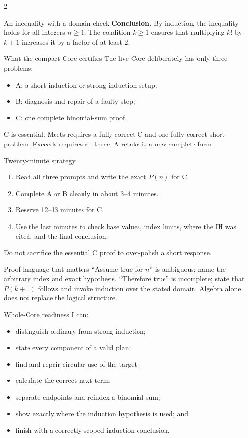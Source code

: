 \documentclass[10pt]{article}
\begin{document}
\begin{multicols}{2}
\begin{workedbox}{An inequality with a domain check}
\textbf{Conclusion.} By induction, the inequality holds for all integers
$n\ge1$. The condition $k\ge1$ ensures that multiplying $k!$ by $k+1$
increases it by a factor of at least $2$.
\end{workedbox}

\columnbreak

\begin{definitionbox}{What the compact Core certifies}
The live Core deliberately has only three problems:
\begin{itemize}
  \item A: a short induction or strong-induction setup;
  \item B: diagnosis and repair of a faulty step;
  \item C: one complete binomial-sum proof.
\end{itemize}
C is essential. Meets requires a fully correct C and one fully correct short
problem. Exceeds requires all three. A retake is a new complete form.
\end{definitionbox}

\begin{methodbox}{Twenty-minute strategy}
\begin{enumerate}
  \item Read all three prompts and write the exact $P(n)$ for C.
  \item Complete A or B cleanly in about 3--4 minutes.
  \item Reserve 12--13 minutes for C.
  \item Use the last minutes to check base values, index limits, where the IH
  was cited, and the final conclusion.
\end{enumerate}
Do not sacrifice the essential C proof to over-polish a short response.
\end{methodbox}

\begin{warningbox}{Proof language that matters}
``Assume true for $n$'' is ambiguous; name the arbitrary index and exact
hypothesis. ``Therefore true'' is incomplete; state that $P(k+1)$ follows and
invoke induction over the stated domain. Algebra alone does not replace the
logical structure.
\end{warningbox}

\begin{checklistbox}{Whole-Core readiness}
I can:
\begin{itemize}
  \item distinguish ordinary from strong induction;
  \item state every component of a valid plan;
  \item find and repair circular use of the target;
  \item calculate the correct next term;
  \item separate endpoints and reindex a binomial sum;
  \item show exactly where the induction hypothesis is used; and
  \item finish with a correctly scoped induction conclusion.
\end{itemize}
\end{checklistbox}
\end{multicols}
\end{document}

